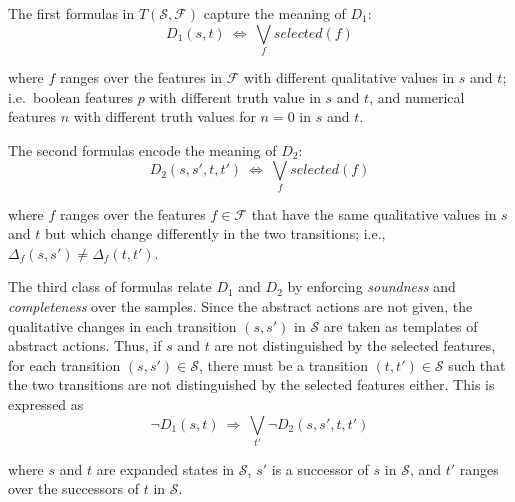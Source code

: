 \documentclass[letterpaper]{article} %
\newcommand{\Omit}[1]{}
\newcommand{\F}{\mathcal{F}}
\renewcommand{\S}{\mathcal{S}}
\begin{document}
\medskip
\noindent The first formulas in $T(\S,\F)$ capture the meaning of $D_1$:
%  
\begin{equation}
  \label{eq:d1}
  D_1(s, t) \ \Leftrightarrow\ \textstyle \bigvee_{f}  selected(f)
\end{equation}

\noindent where $f$ ranges over the features in $\F$ with  different qualitative
values in $s$ and $t$; i.e.\ boolean features $p$ with different truth value
in $s$ and $t$, and numerical features $n$ with different truth values for
 $n=0$ in $s$ and $t$. 

The second formulas encode the meaning of $D_2$:
%
\begin{equation}
  \label{eq:d2}
  D_2(s, s', t, t') \ \Leftrightarrow\ \textstyle\bigvee_f  selected(f)
\end{equation}

\noindent where $f$ ranges over the features $f \in \F$ that have the same
qualitative values in $s$ and $t$ but which change differently in the two
transitions; i.e., $\Delta_f(s, s') \neq \Delta_f(t, t')$.

The third class of formulas relate $D_1$ and $D_2$ by enforcing \emph{soundness}
and \emph{completeness} over  the samples.  Since the abstract actions  are not given,
the qualitative changes in each  transition $(s,s')$ in $\S$
are  taken as templates  of abstract actions. Thus, if $s$ and $t$ are not distinguished by the selected features, 
for each transition $(s, s') \in \S$, there must be a transition $(t, t') \in \S$
such that the two transitions are not distinguished by the selected features either.
This is expressed as
%
\begin{equation}
  \label{eq:bridge1}
  \neg D_1(s, t) \  \Rightarrow\ \textstyle\bigvee_{t'} \neg D_2(s, s', t, t')
\end{equation}

\noindent where $s$ and $t$ are expanded states in  $\S$, $s'$ is a successor of $s$ in $\S$,
and $t'$ ranges over the successors of $t$ in $\S$.

\Omit{ %
  Refer to this as an ``efficiency optimization'' ..
  
  such that $s < t$, and transition $(s,s')$ in $\S$. Due to the symmetry breaking caused by the constraint $s < t$,
  the following formulas are also needed

\begin{equation}
  \label{eq:bridge2}
  \neg D_1(s, t) \, \rightarrow \, \bigvee_{s'} \neg D_2(s, s', t, t')
\end{equation}

\noindent where the  iteration in the right hand disjunction goes over the different successor states $s'$ of the first argument
$s$ of $D_1$ that are in the sample set $\S$, $s$ and $t$ are states in $\S_1$ as before with $s < t$, and $t'$ is a
successor state of $t$ in $\S$; i.e. $(t,t') \in \S$.
}
\end{document}
